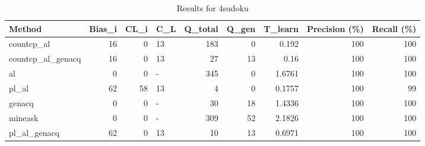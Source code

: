 \begin{table}[ht]
\caption{Results for 4sudoku}
\begin{tabular}{lrrlrrrrr}
\hline
 Method            &   Bias\_i &   CL\_i & C\_L   &   Q\_total &   Q\_gen &   T\_learn &   Precision (\%) &   Recall (\%) \\
\hline
 countcp\_al        &       16 &      0 & 13    &       183 &       0 &    0.192  &             100 &          100 \\
 countcp\_al\_genacq &       16 &      0 & 13    &        27 &      13 &    0.16   &             100 &          100 \\
 al                &        0 &      0 & -     &       345 &       0 &    1.6761 &             100 &          100 \\
 pl\_al             &       62 &     58 & 13    &         4 &       0 &    0.1757 &             100 &           99 \\
 genacq            &        0 &      0 & -     &        30 &      18 &    1.4336 &             100 &          100 \\
 mineask           &        0 &      0 & -     &       309 &      52 &    2.1826 &             100 &          100 \\
 pl\_al\_genacq      &       62 &      0 & 13    &        10 &      13 &    0.6971 &             100 &          100 \\
\hline
\end{tabular}
\end{table}